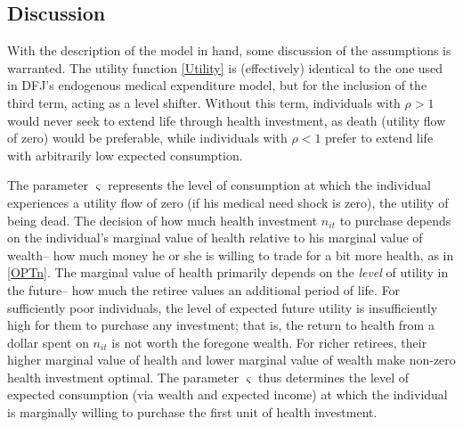 \documentclass[12pt,pdftex,letterpaper]{article}
\newcommand{\Invst}{n}
\newcommand{\LifeUtility}{\varsigma}
\newcommand{\CRRAcon}{\rho}
\begin{document}
\subsection{Discussion}
\label{sec:ModelDisc}

With the description of the model in hand, some discussion of the assumptions is warranted.  The utility function \eqref{Utility} is (effectively) identical to the one used in DFJ's endogenous medical expenditure model, but for the inclusion of the third term, acting as a level shifter.  Without this term, individuals with $\CRRAcon > 1$ would never seek to extend life through health investment, as death (utility flow of zero) would be preferable, while individuals with $\CRRAcon < 1$ prefer to extend life with arbitrarily low expected consumption.

The parameter $\LifeUtility$ represents the level of consumption at which the individual experiences a utility flow of zero (if his medical need shock is zero), the utility of being dead.  The decision of how much health investment $\Invst_{it}$ to purchase depends on the individual's marginal value of health relative to his marginal value of wealth-- how much money he or she is willing to trade for a bit more health, as in \eqref{OPTn}.  The marginal value of health primarily depends on the \textit{level} of utility in the future-- how much the retiree values an additional period of life.  For sufficiently poor individuals, the level of expected future utility is insufficiently high for them to purchase any investment; that is, the return to health from a dollar spent on $\Invst_{it}$ is not worth the foregone wealth.  For richer retirees, their higher marginal value of health and lower marginal value of wealth make non-zero health investment optimal. The parameter $\LifeUtility$ thus determines the level of expected consumption (via wealth and expected income) at which the individual is marginally willing to purchase the first unit of health investment.
\end{document}
